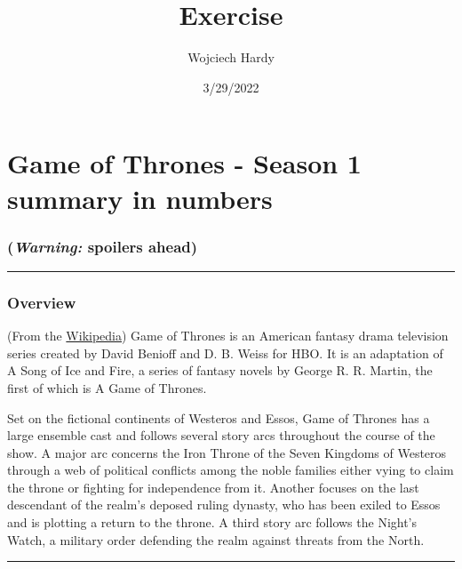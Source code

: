 \documentclass[
]{article}
\title{Exercise}
\author{Wojciech Hardy}
\date{3/29/2022}
\begin{document}
\maketitle

\hypertarget{game-of-thrones---season-1-summary-in-numbers}{%
\section{Game of Thrones - Season 1 summary in
numbers}\label{game-of-thrones---season-1-summary-in-numbers}}

\hypertarget{warning-spoilers-ahead}{%
\subsubsection{\texorpdfstring{\textbf{(\emph{Warning:} spoilers
ahead)}}{(Warning: spoilers ahead)}}\label{warning-spoilers-ahead}}

\begin{center}\rule{0.5\linewidth}{0.5pt}\end{center}

\hypertarget{overview}{%
\subsubsection{Overview}\label{overview}}

(From the
\href{https://en.wikipedia.org/wiki/Game_of_Thrones\#Premise}{Wikipedia})
Game of Thrones is an American fantasy drama television series created
by David Benioff and D. B. Weiss for HBO. It is an adaptation of A Song
of Ice and Fire, a series of fantasy novels by George R. R. Martin, the
first of which is A Game of Thrones.

Set on the fictional continents of Westeros and Essos, Game of Thrones
has a large ensemble cast and follows several story arcs throughout the
course of the show. A major arc concerns the Iron Throne of the Seven
Kingdoms of Westeros through a web of political conflicts among the
noble families either vying to claim the throne or fighting for
independence from it. Another focuses on the last descendant of the
realm's deposed ruling dynasty, who has been exiled to Essos and is
plotting a return to the throne. A third story arc follows the Night's
Watch, a military order defending the realm against threats from the
North.

\begin{center}\rule{0.5\linewidth}{0.5pt}\end{center}
\end{document}
